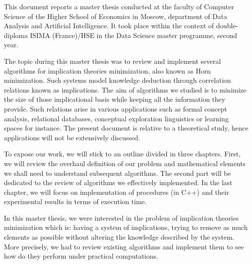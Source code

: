 \documentclass[a4paper, 10pt]{report}
\begin{document}
\tableofcontents



This document reports a master thesis conducted at the faculty of Computer Science of the Higher School of Economics in Moscow, department of Data Analysis and Artificial Intelligence. It took place within the context of double-diploma ISIMA (France)/HSE in the Data Science master programme, second year.

\vspace{1.2em}

The topic during this master thesis was to review and implement several algorithms for implication theories minimization, also known as Horn minimization. Such systems model knowledge deduction through correlation relations known as implications. The aim of algorithms we studied is to minimize the size of those implicational basis while
keeping all the information they provide. Such relations arise in various applications such as formal concept analysis, relational databases, conceptual exploration linguistics or learning spaces for instance. The present
document is relative to a theoretical study, hence applications will not be extensively discussed.

\vspace{1.2em}

To expose our work, we will stick to an outline divided in three chapters. First, we will review the overhaul definition of our problem and mathematical elements we shall need to understand subsequent algorithms. The second part will be dedicated to the review of algorithms we effectively implemented. In
the last chapter, we will focus on implementation of procedures (in C++) and their experimental results in terms of execution time.












In this master thesis, we were interested in the problem of implication theories minimization which is: having a system of implications, trying to remove as much elements as possible without altering the knowledge described by
the system. More precisely, we had to review existing algorithms and implement them to see how do they perform under practical computations.
\end{document}
